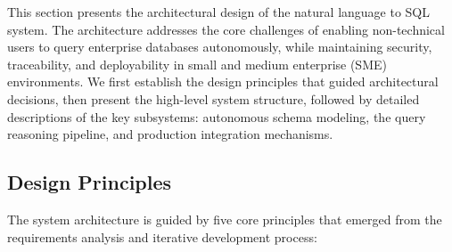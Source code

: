 This section presents the architectural design of the natural language to SQL system.
The architecture addresses the core challenges of enabling non-technical users to query enterprise databases autonomously, while maintaining security, traceability, and deployability in small and medium enterprise (SME) environments.
We first establish the design principles that guided architectural decisions, then present the high-level system structure, followed by detailed descriptions of the key subsystems: autonomous schema modeling, the query reasoning pipeline, and production integration mechanisms.

\subsection{Design Principles}
\label{subsec:design-principles}

The system architecture is guided by five core principles that emerged from the requirements analysis and iterative development process:

